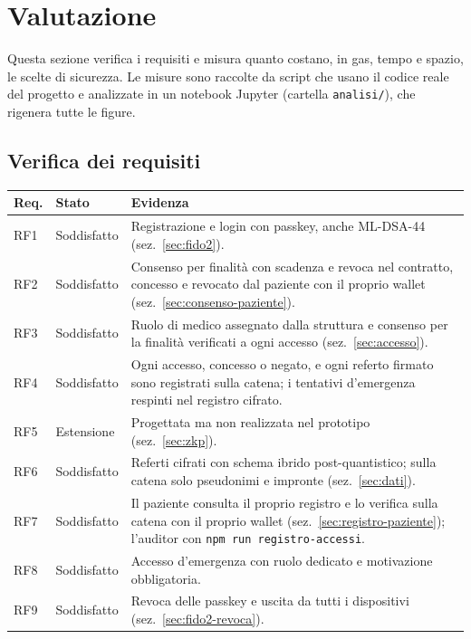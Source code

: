 \section{Valutazione}\label{sec:valutazione}

Questa sezione verifica i requisiti e misura quanto costano, in gas, tempo e spazio, le scelte di sicurezza. Le misure sono raccolte da script che usano il codice reale del progetto e analizzate in un notebook Jupyter (cartella \texttt{analisi/}), che rigenera tutte le figure.

\subsection{Verifica dei requisiti}
\begin{table}[H]
\centering\footnotesize
\renewcommand{\arraystretch}{1.2}
\begin{tabular}{@{}p{}p{}p{}@{}}
\toprule
Req. & Stato & Evidenza\\
\midrule
RF1 & Soddisfatto & Registrazione e login con passkey, anche ML-DSA-44 (sez.~\ref{sec:fido2}).\\
RF2 & Soddisfatto & Consenso per finalità con scadenza e revoca nel contratto, concesso e revocato dal paziente con il proprio wallet (sez.~\ref{sec:consenso-paziente}).\\
RF3 & Soddisfatto & Ruolo di medico assegnato dalla struttura e consenso per la finalità verificati a ogni accesso (sez.~\ref{sec:accesso}).\\
RF4 & Soddisfatto & Ogni accesso, concesso o negato, e ogni referto firmato sono registrati sulla catena; i tentativi d'emergenza respinti nel registro cifrato.\\
RF5 & Estensione & Progettata ma non realizzata nel prototipo (sez.~\ref{sec:zkp}).\\
RF6 & Soddisfatto & Referti cifrati con schema ibrido post-quantistico; sulla catena solo pseudonimi e impronte (sez.~\ref{sec:dati}).\\
RF7 & Soddisfatto & Il paziente consulta il proprio registro e lo verifica sulla catena con il proprio wallet (sez.~\ref{sec:registro-paziente}); l'auditor con \texttt{npm run registro-accessi}.\\
RF8 & Soddisfatto & Accesso d'emergenza con ruolo dedicato e motivazione obbligatoria.\\
RF9 & Soddisfatto & Revoca delle passkey e uscita da tutti i dispositivi (sez.~\ref{sec:fido2-revoca}).\\

\end{tabular}
\end{table}
